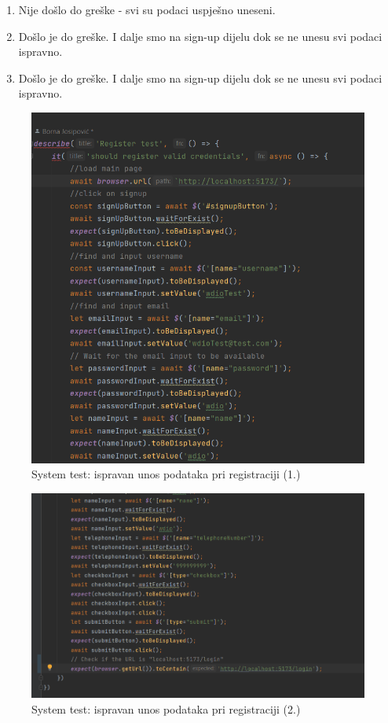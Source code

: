 				\begin{enumerate}
					\item Nije došlo do greške - svi su podaci uspješno uneseni.
					\item Došlo je do greške. I dalje smo na sign-up dijelu dok se ne unesu svi podaci ispravno.
					\item Došlo je do greške. I dalje smo na sign-up dijelu dok se ne unesu svi podaci ispravno.
				\end{enumerate}
			
			\begin{figure}[H]
				\includegraphics[scale=0.7]{slike/sysreg1.PNG} 
				\centering
				\caption{System test: ispravan unos podataka pri registraciji (1.)}
				\label{sysreg1}
			\end{figure}
			
			\begin{figure}[H]
				\includegraphics[scale=0.7]{slike/sysreg2.PNG} 
				\centering
				\caption{System test: ispravan unos podataka pri registraciji (2.)}
				\label{sysreg2}
			\end{figure}
			
